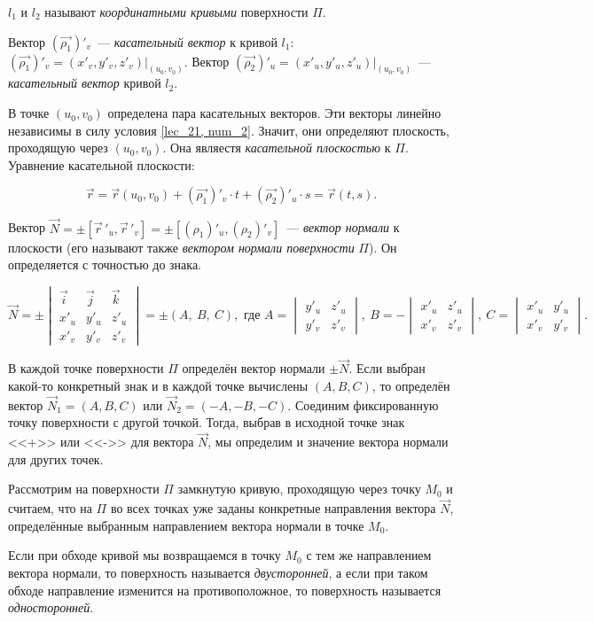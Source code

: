 \documentclass[../../main.tex]{subfiles}
\begin{document}
$l_1$ и $l_2$ называют \emph{координатными кривыми} поверхности $\Pi$.

Вектор $(\vec{\rho_1})'_v$~--- \emph{касательный вектор} к кривой $l_1$:
$(\vec{\rho_1})'_v = (x'_v, y'_v, z'_v) \Big|_{(u_0,v_0)}.$
Вектор $(\vec{\rho_2})'_u = (x'_u, y'_u, z'_u) \Big|_{(u_0,v_0)}$~--- 
\emph{касательный вектор} кривой $l_2$. 

В точке $(u_0, v_0)$ определена пара касательных векторов.
Эти векторы линейно независимы в силу условия \eqref{lec_21, num_2}. 
Значит, они определяют плоскость, проходящую через $(u_0,v_0)$.
Она являестя \emph{касательной плоскостью} к $\Pi$. 
Уравнение касательной плоскости:

\[\vec{r} = \vec{r}(u_0,v_0) + (\vec{\rho_1})'_v \cdot t +
(\vec{\rho_2})'_u \cdot s = 
\vec{r}(t,s)
.\]

Вектор $\vec{N} = \pm \left[ \vec r\,'_u, \vec r\,'_v \right] = 
\pm \left[ (\rho_1)'_u, (\rho_2)'_v  \right]$~--- 
\emph{вектор нормали} к плоскости 
(его называют также \emph{вектором нормали поверхности} $\Pi$).
Он определяется с точностью до знака.

\[
\vec{N} = 
\pm \begin{vmatrix}
\vec{i} & \vec{j} & \vec{k} \\
x'_u & y'_u & z'_u \\
x'_v & y'_v & z'_v
\end{vmatrix} = 
\pm (A,\ B,\ C)
, \text{ где } A = \begin{vmatrix}
y'_u & z'_u \\
 y'_v & z'_v
\end{vmatrix},\ 
B = -\begin{vmatrix}
x'_u & z'_u \\
x'_v & z'_v
\end{vmatrix},\
C = \begin{vmatrix}
x'_u & y'_u \\
x'_v & y'_v
\end{vmatrix}
.\]

В каждой точке поверхности $\Pi$ определён вектор нормали $\pm \vec{N}$.
Если выбран какой-то конкретный знак и в каждой точке вычислены
$(A, B, C)$, то определён вектор $\vec{N}_1 = (A, B, C)$ или
$\vec{N}_2 = (-A, -B, -C)$.
Соединим фиксированную точку поверхности с другой точкой.
Тогда, выбрав в исходной точке знак <<+>> или <<->> для вектора $\vec{N}$,
мы определим и значение вектора нормали для других точек.

Рассмотрим на поверхности $\Pi$ замкнутую кривую, 
проходящую через точку $M_0$ и
считаем, что на $\Pi$ во всех точках уже заданы конкретные направления
вектора $\vec{N}$, определённые выбранным направлением вектора нормали в точке 
$M_0$. 

Если при обходе кривой мы возвращаемся в точку $M_0$ с тем же
направлением вектора нормали, то поверхность называется \emph{двусторонней},
а если при таком обходе направление изменится на противоположное,
то поверхность называется \emph{односторонней}.
\end{document}
